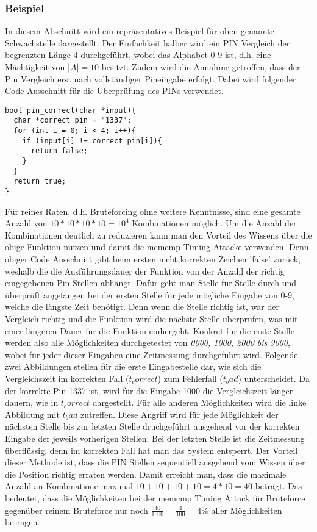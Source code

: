 \documentclass[a4paper,
DIV=13,
12pt,
BCOR=10mm,
department=FakIM,
oneside,
parskip=half,
automark,
listof=totocnumbered,
bibliography=totocnumbered,
acronym=totocnumbered
] {OTHRartcl}
\begin{document}
\subsubsection{Beispiel}
In diesem Abschnitt wird ein repräsentatives Beispiel für oben genannte Schwachstelle dargestellt.
Der Einfachkeit halber wird ein PIN Vergleich der begrenzten Länge 4 durchgeführt, wobei das Alphabet 0-9 ist, d.h. eine Mächtigkeit von $|A| = 10$ besitzt.
Zudem wird die Annahme getroffen, dass der Pin Vergleich erst nach vollständiger Pineingabe erfolgt. Dabei
wird folgender Code Ausschnitt für die Überprüfung des PINs verwendet.
\begin{verbatim}
bool pin_correct(char *input){
  char *correct_pin = "1337";
  for (int i = 0; i < 4; i++){
    if (input[i] != correct_pin[i]){
      return false;
    }
  }
  return true;
}
\end{verbatim}

Für reines Raten, d.h. Bruteforcing ohne weitere Kenntnisse, sind eine gesamte Anzahl von $ 10*10*10*10 = 10^4 $ Kombinationen möglich.
Um die Anzahl der Kombinationen deutlich zu reduzieren kann man den Vorteil des Wissens über die obige Funktion nutzen und damit
die memcmp Timing Attacke verwenden.
Denn obiger Code Ausschnitt gibt beim ersten nicht korrekten Zeichen 'false' zurück, weshalb die die Ausführungsdauer der
Funktion von der Anzahl der richtig eingegebenen Pin Stellen abhängt.
Dafür geht man Stelle für Stelle durch und überprüft angefangen bei der ersten Stelle für jede mögliche Eingabe von 0-9, welche die längste Zeit benötigt.
Denn wenn die Stelle richtig ist, war der Vergleich richtig und die Funktion wird die nächste Stelle überprüfen, was mit einer längeren Dauer für die Funktion
einhergeht.
Konkret für die erste Stelle werden also alle Möglichkeiten durchgetestet von \textit{0000, 1000, 2000 bis 9000}, wobei für jeder dieser Eingaben
eine Zeitmessung durchgeführt wird.
Folgende zwei Abbildungen stellen für die erste Eingabestelle dar, wie sich die Vergleichszeit im
korrekten Fall ($t_correct$) zum Fehlerfall ($t_bad$) unterscheidet.
Da der korrekte Pin 1337 ist, wird für die Eingabe 1000 die Vergleichszeit länger dauern, wie in $t_correct$ dargestellt.
Für alle anderen Möglichkeiten wird die linke Abbildung mit $t_bad$ zutreffen.
Diese Angriff wird für jede Möglichkeit der nächsten Stelle bis zur letzten Stelle druchgeführt ausgehend vor der korrekten Eingabe der jeweils vorherigen Stellen.
Bei der letzten Stelle ist die Zeitmessung überflüssig, denn im korrekten Fall hat man das System entsperrt.
Der Vorteil dieser Methode ist, dass die PIN Stellen sequentiell ausgehend vom Wissen über die Position richtig erraten werden.
Damit erreicht man, dass die maximale Anzahl an Kombinatione maximal $10+10+10+10 = 4*10 = 40 $ beträgt.
Das bedeutet, dass die Möglichkeiten bei der memcmp Timing Attack für Bruteforce gegenüber reinem Bruteforce nur noch $\frac{40}{1000} = \frac{4}{100} = 4\% $
aller Möglichkeiten betragen.
\end{document}
